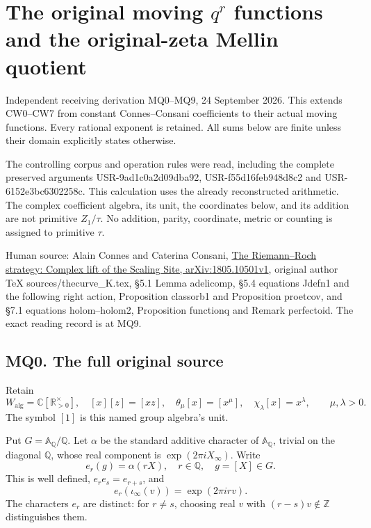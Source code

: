 \section{\texorpdfstring{The original moving \(q^r\) functions and the
original-zeta Mellin
quotient}{The original moving q\^{}r functions and the original-zeta Mellin quotient}}\label{the-original-moving-qr-functions-and-the-original-zeta-mellin-quotient}

Independent receiving derivation MQ0--MQ9, 24 September 2026. This
extends CW0--CW7 from constant Connes--Consani coefficients to their
actual moving functions. Every rational exponent is retained. All sums
below are finite unless their domain explicitly states otherwise.

The controlling corpus and operation rules were read, including the
complete preserved arguments USR-9ad1c0a2d09dba92, USR-f55d16feb948d8c2
and USR-6152e3bc6302258c. This calculation uses the already
reconstructed arithmetic. The complex coefficient algebra, its unit, the
coordinates below, and its addition are not primitive \(Z_1/\tau\). No
addition, parity, coordinate, metric or counting is assigned to
primitive \(\tau\).

Human source: Alain Connes and Caterina Consani,
\href{https://arxiv.org/abs/1805.10501v1}{The Riemann--Roch strategy:
Complex lift of the Scaling Site, arXiv:1805.10501v1}, original author
TeX sources/thecurve\_K.tex, §5.1 Lemma adelicomp, §5.4 equations Jdefn1
and the following right action, Proposition classorb1 and Proposition
proetcov, and §7.1 equations holom--holom2, Proposition functionq and
Remark perfectoid. The exact reading record is at MQ9.

\subsection{MQ0. The full original
source}\label{mq0.-the-full-original-source}

Retain \[
W_{\mathrm{alg}}=\mathbb C[\mathbb R_{>0}^{\times}],\quad
[x][z]=[xz],\quad\theta_\mu[x]=[x^\mu],
\quad\chi_\lambda[x]=x^\lambda,\qquad\mu,\lambda>0.
\tag{MQ0.1}
\] The symbol \([1]\) is this named group algebra's unit.

Put \(G=\mathbb A_{\mathbb Q}/\mathbb Q\). Let \(\alpha\) be the
standard additive character of \(\mathbb A_{\mathbb Q}\), trivial on the
diagonal \(\mathbb Q\), whose real component is
\(\exp(2\pi i X_\infty)\). Write \[
e_r(g)=\alpha(rX),\quad r\in\mathbb Q,\quad g=[X]\in G.
\] This is well defined, \(e_re_s=e_{r+s}\), and \[
e_r(\iota_\infty(v))=\exp(2\pi i rv).
\tag{MQ0.2}
\] The characters \(e_r\) are distinct: for \(r\ne s\), choosing real
\(v\) with \((r-s)v\notin\mathbb Z\) distinguishes them.

